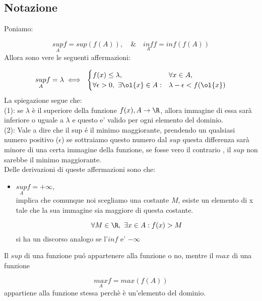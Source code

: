 \documentclass[../analisi.tex]{subfiles}
\begin{document}
\subsection{Notazione}%
\label{sub:notazione}
Poniamo:

\begin{equation}
	\underset{A}{sup} f = sup (f(A)), \quad \& \quad
	\underset{A}{inf} f = inf (f(A))
\end{equation}
Allora sono vere le seguenti affermazioni:


\begin{equation}
	\underset{A}{sup} f = \lambda \iff\
	\begin{cases}
		f(x) \leq \lambda, & \forall x \in A,\\
		\forall \epsilon > 0,\ \exists \ol{x} \in A: &
		 \lambda - \epsilon
		< f(\ol{x})
	\end{cases}
\end{equation}
La spiegazione segue che:\\
(1): se $\lambda$ è il superiore della funzione $f(x), A \to \R$, allora \bt{
ogni} immagine di essa sarà inferiore o uguale a $\lambda$ e questo 
e' valido per ogni elemento del dominio.\\
(2): Vale a dire che il sup é il minimo maggiorante, prendendo un qualsiasi 
	numero positivo ($\epsilon$) se sottraiamo
	questo numero dal $sup$ questa differenza sarà minore di una certa immagine
	della funzione, se fosse vero il contrario \Lightning, il $sup$ non sarebbe
	il minimo maggiorante.\\
Delle derivazioni di queste affermazioni sono che:

\begin{itemize}
	\item $\underset{A}{sup} f = + \infty$,\\
		implica che comunque noi scegliamo una costante $M$, esiste un
		elemento di x tale che la sua immagine sia maggiore di questa 
		costante.

		\begin{equation}
			\forall M \in \R,\ \exists x \in A: f(x) > M
		\end{equation}
		si ha un discorso analogo se l'$inf$ e' $- \infty$
\end{itemize}
Il $sup$ di una funzione puó appartenere alla funzione o no, mentre
il $max$ di una funzione 

\begin{equation}
	\underset{A}{max} f = max (f(A))
\end{equation}
appartiene alla funzione stessa perchè è un'elemento del dominio.
\end{document}
